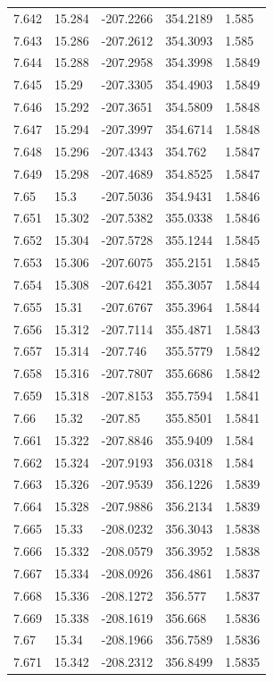 \begin{tabular}{lllll}
7.642 & 15.284 & -207.2266 & 354.2189 & 1.585 \\
7.643 & 15.286 & -207.2612 & 354.3093 & 1.585 \\
7.644 & 15.288 & -207.2958 & 354.3998 & 1.5849 \\
7.645 & 15.29 & -207.3305 & 354.4903 & 1.5849 \\
7.646 & 15.292 & -207.3651 & 354.5809 & 1.5848 \\
7.647 & 15.294 & -207.3997 & 354.6714 & 1.5848 \\
7.648 & 15.296 & -207.4343 & 354.762 & 1.5847 \\
7.649 & 15.298 & -207.4689 & 354.8525 & 1.5847 \\
7.65 & 15.3 & -207.5036 & 354.9431 & 1.5846 \\
7.651 & 15.302 & -207.5382 & 355.0338 & 1.5846 \\
7.652 & 15.304 & -207.5728 & 355.1244 & 1.5845 \\
7.653 & 15.306 & -207.6075 & 355.2151 & 1.5845 \\
7.654 & 15.308 & -207.6421 & 355.3057 & 1.5844 \\
7.655 & 15.31 & -207.6767 & 355.3964 & 1.5844 \\
7.656 & 15.312 & -207.7114 & 355.4871 & 1.5843 \\
7.657 & 15.314 & -207.746 & 355.5779 & 1.5842 \\
7.658 & 15.316 & -207.7807 & 355.6686 & 1.5842 \\
7.659 & 15.318 & -207.8153 & 355.7594 & 1.5841 \\
7.66 & 15.32 & -207.85 & 355.8501 & 1.5841 \\
7.661 & 15.322 & -207.8846 & 355.9409 & 1.584 \\
7.662 & 15.324 & -207.9193 & 356.0318 & 1.584 \\
7.663 & 15.326 & -207.9539 & 356.1226 & 1.5839 \\
7.664 & 15.328 & -207.9886 & 356.2134 & 1.5839 \\
7.665 & 15.33 & -208.0232 & 356.3043 & 1.5838 \\
7.666 & 15.332 & -208.0579 & 356.3952 & 1.5838 \\
7.667 & 15.334 & -208.0926 & 356.4861 & 1.5837 \\
7.668 & 15.336 & -208.1272 & 356.577 & 1.5837 \\
7.669 & 15.338 & -208.1619 & 356.668 & 1.5836 \\
7.67 & 15.34 & -208.1966 & 356.7589 & 1.5836 \\
7.671 & 15.342 & -208.2312 & 356.8499 & 1.5835 \\

\end{tabular}
